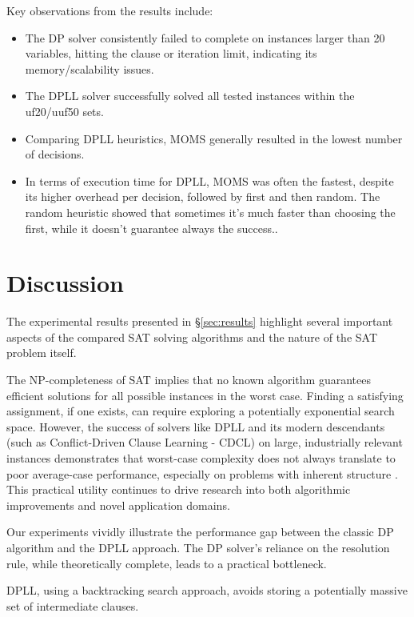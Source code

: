 \documentclass[12pt, a4paper]{article}
\begin{document}
Key observations from the results include:
\begin{itemize}
    \item The DP solver consistently failed to complete on instances larger than 20 variables, hitting the clause or iteration limit, indicating its memory/scalability issues.
    \item The DPLL solver successfully solved all tested instances within the uf20/uuf50 sets.
    \item Comparing DPLL heuristics, MOMS generally resulted in the lowest number of decisions.
    \item In terms of execution time for DPLL, MOMS was often the fastest, despite its higher overhead per decision, followed by first and then random. The random heuristic showed that sometimes it's much faster than choosing the first, while it doesn't guarantee always the success..
\end{itemize}

\section{Discussion}
\label{sec:discussion}

The experimental results presented in \S\ref{sec:results} highlight several important aspects of the compared SAT solving algorithms and the nature of the SAT problem itself.

The NP-completeness of SAT implies that no known algorithm guarantees efficient solutions for all possible instances in the worst case. Finding a satisfying assignment, if one exists, can require exploring a potentially exponential search space. However, the success of solvers like DPLL and its modern descendants (such as Conflict-Driven Clause Learning - CDCL) on large, industrially relevant instances demonstrates that worst-case complexity does not always translate to poor average-case performance, especially on problems with inherent structure \cite{Autoblocks}. This practical utility continues to drive research into both algorithmic improvements and novel application domains.

Our experiments vividly illustrate the performance gap between the classic DP algorithm and the DPLL approach. The DP solver's reliance on the resolution rule, while theoretically complete, leads to a practical bottleneck.

DPLL, using a backtracking search approach, avoids storing a potentially massive set of intermediate clauses.
\end{document}
